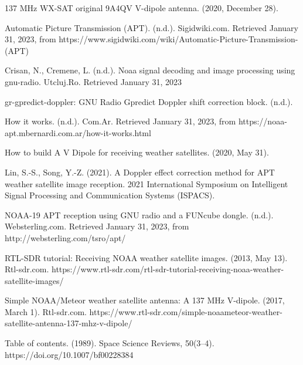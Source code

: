 \documentclass[a4paper,openright,12pt]{article}
\begin{document}
\begin{thebibliography}{11}


137 MHz WX-SAT original 9A4QV V-dipole antenna. (2020, December 28).

Automatic Picture Transmission (APT). (n.d.). Sigidwiki.com. Retrieved January 31, 2023, from https://www.sigidwiki.com/wiki/Automatic-Picture-Transmission-(APT)

Crisan, N., Cremene, L. (n.d.). Noaa signal decoding and image processing using gnu-radio. Utcluj.Ro. Retrieved January 31, 2023

gr-gpredict-doppler: GNU Radio Gpredict Doppler shift correction block. (n.d.).

How it works. (n.d.). Com.Ar. Retrieved January 31, 2023, from https://noaa-apt.mbernardi.com.ar/how-it-works.html

How to build A V Dipole for receiving weather satellites. (2020, May 31).

Lin, S.-S., Song, Y.-Z. (2021). A Doppler effect correction method for APT weather satellite image reception. 2021 International Symposium on Intelligent Signal Processing and Communication Systems (ISPACS).

NOAA-19 APT reception using GNU radio and a FUNcube dongle. (n.d.). Websterling.com. Retrieved January 31, 2023, from http://websterling.com/tsro/apt/

RTL-SDR tutorial: Receiving NOAA weather satellite images. (2013, May 13). Rtl-sdr.com. https://www.rtl-sdr.com/rtl-sdr-tutorial-receiving-noaa-weather-satellite-images/


Simple NOAA/Meteor weather satellite antenna: A 137 MHz V-dipole. (2017, March 1). Rtl-sdr.com. https://www.rtl-sdr.com/simple-noaameteor-weather-satellite-antenna-137-mhz-v-dipole/


Table of contents. (1989). Space Science Reviews, 50(3–4). https://doi.org/10.1007/bf00228384


\end{thebibliography}
\end{document}
